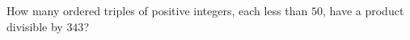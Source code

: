 How many ordered triples of positive integers, each less than $50$, have a product divisible by $343$?
